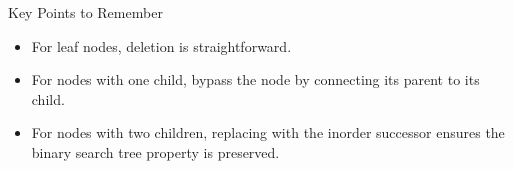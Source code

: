 \begin{properties}[]{Key Points to Remember}
    \begin{itemize}
        \item For leaf nodes, deletion is straightforward.
        \item For nodes with one child, bypass the node by connecting its parent to its child.
        \item For nodes with two children, replacing with the inorder successor ensures the binary search tree property is preserved.
    \end{itemize}
\end{properties}
